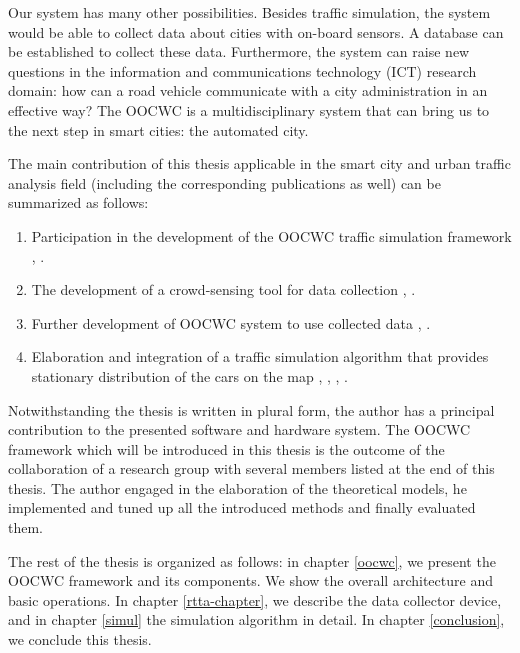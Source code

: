 \documentclass[b5paper,12pt]{report}
\theoremstyle{definition}
\begin{document}
Our system has many other possibilities. Besides traffic simulation, the system would be able to collect data about cities with on-board sensors. A database can be established to collect these data. Furthermore, the system can raise new questions in the information and communications technology (ICT) research domain: how can a road vehicle communicate with a city administration in an effective way? The OOCWC is a multidisciplinary system that can bring us to the next step in smart cities: the automated city.

The main contribution of this thesis applicable in the smart city and urban traffic analysis field (including the corresponding publications as well) can be summarized as follows:

\begin{enumerate}
  \item Participation in the development of the OOCWC traffic simulation framework \cite{7231223}, \cite{infocomjournal}.
  \item The development of a crowd-sensing tool for data collection \cite[real-time-traffic-analyzer subfolder]{csts-repo}, \cite{usingcoginfocom}.
  \item Further development of OOCWC system to use collected data \cite{infocomjournal}, \cite{csts-repo}.
  \item Elaboration and integration of a traffic simulation algorithm that provides stationary distribution of the cars on the map \cite{traffic-paper}, \cite{markov-traffic-paper} \cite{dssv-talk}, \cite{zeg-talk}, \cite[justine subfolder]{csts-repo}.
\end{enumerate}

Notwithstanding the thesis is written in plural form, the author has a principal contribution to the presented software and hardware system. The OOCWC framework which will be introduced in this thesis is the outcome of the collaboration of a research group with several members listed at the end of this thesis. The author engaged in the elaboration of the theoretical models, he implemented and tuned up all the introduced methods and finally evaluated them.

The rest of the thesis is organized as follows: in chapter \ref{oocwc}, we present the OOCWC framework and its components. We show the overall architecture and basic operations. In chapter \ref{rtta-chapter}, we describe the data collector device, and in chapter \ref{simul} the simulation algorithm in detail. In chapter \ref{conclusion}, we conclude this thesis.
\end{document}
